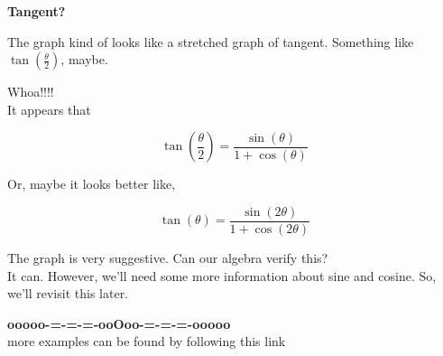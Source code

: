 \documentclass{ximera}
\begin{document}
\begin{observation}   \textbf{Tangent?}


The graph kind of looks like a stretched graph of tangent.  Something like $\tan\left( \frac{\theta}{2} \right)$, maybe.






\begin{center}
\end{center}


Whoa!!!! \\


It appears that


\[   \tan\left( \frac{\theta}{2} \right)   = \frac{\sin(\theta)}{1 + \cos(\theta)}   \]




Or, maybe it looks better like, 




\[   \tan(\theta)   = \frac{\sin(2\theta)}{1 + \cos(2\theta)}   \]





The graph is very suggestive.  Can our algebra verify this? \\


It can.  However, we'll need some more information about sine and cosine.  So, we'll revisit this later.



\end{observation}

















\begin{center}
\textbf{\textcolor{green!50!black}{ooooo-=-=-=-ooOoo-=-=-=-ooooo}} \\

more examples can be found by following this link\\ 

\end{center}
\end{document}
